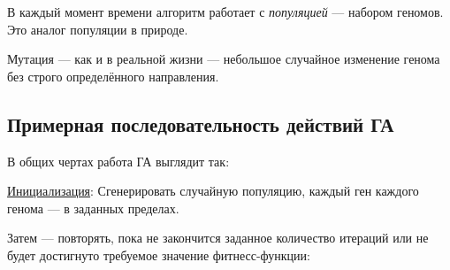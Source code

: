 В каждый момент времени алгоритм работает с \textit{популяцией} — набором геномов.
Это аналог популяции в природе.

Мутация — как и в реальной жизни — небольшое случайное изменение генома без строго определённого направления.

\subsection{Примерная последовательность действий ГА}\label{subsec:approx_ga_algo}
В общих чертах работа ГА выглядит так:

\underline{Инициализация}: Сгенерировать случайную популяцию, каждый ген каждого генома — в заданных пределах.

Затем — повторять, пока не закончится заданное количество итераций или не будет достигнуто требуемое значение фитнесс-функции:

